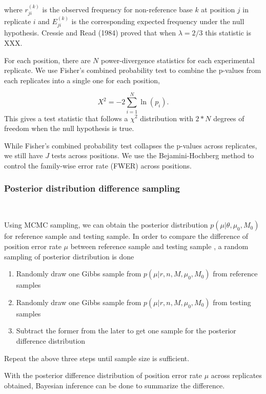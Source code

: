 \documentclass[11pt,reqno]{amsart}
\begin{document}
where $r_{ji}^{(k)}$ is the observed frequency for non-reference base $k$ at position $j$ in replicate $i$ and $E_{ji}^{(k)}$ is the corresponding expected frequency under the null hypothesis. Cressie and Read (1984) proved that when $\lambda = 2/3$ this statistic is XXX.

For each position, there are $N$ power-divergence statistics for each experimental replicate. We use Fisher's combined probability test to combine the p-values from each replicates into a single one for each position,

\begin{equation}
	X^2 = -2 \sum_{i=1}^N \ln(p_i).
\end{equation}
This gives a test statistic that follows a $\chi^2$ distribution with $2*N$ degrees of freedom when the null hypothesis is true.

While Fisher's combined probability test collapses the p-values across replicates, we still have $J$ tests across positions. We use the Bejamini-Hochberg method to control the family-wise error rate (FWER) across positions.

\subsubsection{Posterior distribution difference sampling}\

Using MCMC sampling, we can obtain the posterior distribution $p \left( \mu |\theta,\mu_0,M_0\right)$ for reference sample and testing sample. In order to compare the difference of position error rate $\mu$ between reference sample and testing sample , a random sampling of posterior distribution is done 

\begin{enumerate}
 \item Randomly  draw one Gibbs sample from $p \left( \mu |r, n, M, \mu_0, M_0\right)$ from reference samples
 \item Randomly draw one Gibbs sample from $p \left( \mu |r, n, M, \mu_0,M_0\right) $ from testing samples
 \item Subtract the former from the later to get one sample for the posterior difference distribution 
\end{enumerate}
Repeat the above three steps until sample size is sufficient.

With the posterior difference distribution of position error rate $\mu$ across replicates obtained, Bayesian inference can be done to summarize the difference. 
\end{document}
